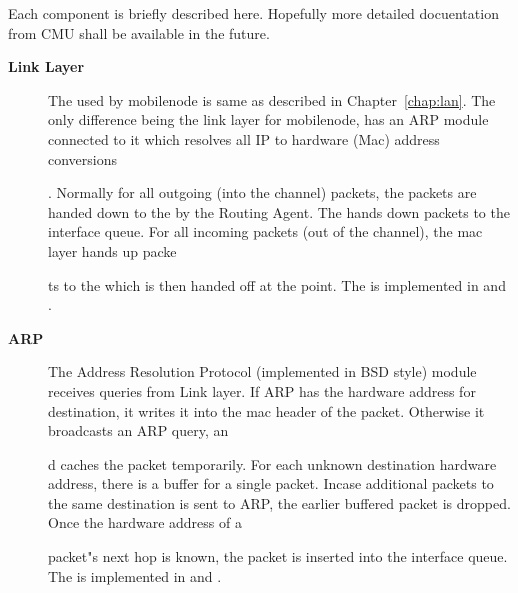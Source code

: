 Each component is briefly described here. Hopefully more detailed docuentation from CMU shall be available in the future.
\begin{description}
\item[{\bf Link Layer}] The  used by mobilenode is same as described in Chapter~\ref{chap:lan}. The only difference being the link layer for mobilenode, has an ARP module connected to it which resolves all IP to hardware (Mac) address conversions











. Normally for all outgoing (into the channel) packets, the packets are handed down to the  by the Routing Agent. The  hands down packets to the interface queue. For all incoming packets (out of the channel), the mac layer hands up packe











ts to the  which is then handed off at the  point. The  is implemented in  and .

\item [{\bf ARP}] The Address Resolution Protocol (implemented in BSD style) module receives queries from Link layer. If ARP has the hardware address for destination, it writes it into the mac header of the packet. Otherwise it broadcasts an ARP query, an











d caches the packet temporarily. For each unknown destination hardware address, there is a buffer for a single packet. Incase additional packets to the same destination is sent to ARP, the earlier buffered packet is dropped. Once the hardware address of a











 packet"s next hop is known, the packet is inserted into the interface queue. The  is implemented in  and .


\end{description}
